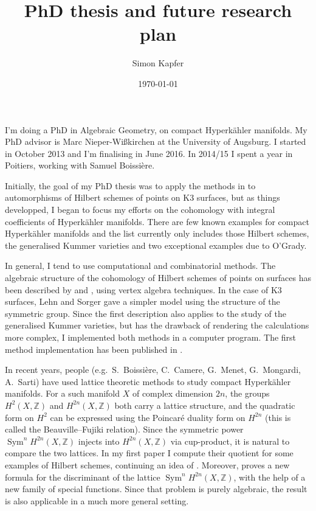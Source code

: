 \documentclass[11pt,a4paper,sans,english]{article}
\title{PhD thesis and future research plan}
\author{Simon Kapfer}
\date{\today}
\DeclareMathOperator{\Sym}{Sym}
\begin{document}
\maketitle
\thispagestyle{plain}

I'm doing a PhD in Algebraic Geometry, on compact Hyperk\"ahler manifolds. My PhD advisor is Marc Nieper-Wi\ss kirchen at the University of Augsburg.
I started in October 2013 and I'm finalising in June 2016. In 2014/15 I spent a year in Poitiers, working with Samuel Boissi\`ere. 

Initially, the goal of my PhD thesis was to apply the methods in \cite{BNS} to automorphisms of Hilbert schemes of points on K3 surfaces, but as things developped, I began to focus my efforts on the cohomology with integral coefficients of Hyperk\"ahler manifolds. There are few known examples for compact Hyperk\"ahler manifolds and the list currently only includes those Hilbert schemes, the generalised Kummer varieties and two exceptional examples due to O'Grady. 

In general, I tend to use computational and combinatorial methods. The algebraic structure of the cohomology of Hilbert schemes of points on surfaces has been described by \cite{LehnSorger} and \cite{LiQinWang}, using vertex algebra techniques. In the case of K3 surfaces, Lehn and Sorger \cite{LehnSorger} gave a simpler model using the structure of the symmetric group. Since the first description also applies to the study of the generalised Kummer varieties, but has the drawback of rendering the calculations more complex, I implemented both methods in a computer program. 
The first method implementation has been published in \cite{SK1}.

In recent years, people (e.g.~S.~Boissi\`ere, C.~Camere, G.~Menet, G.~Mongardi, A.~Sarti) have used lattice theoretic methods to study compact Hyperk\"ahler manifolds. For a such manifold $X$ of complex dimension $2n$, the groups $H^2(X,\mathbb{Z})$ and $H^{2n}(X,\mathbb{Z})$ both carry a lattice structure, and the quadratic form on $H^2$ can be expressed using the Poincar\'e duality form on $H^{2n}$ (this is called the Beauville--Fujiki relation). Since the symmetric power $\Sym^nH^{2n}(X,\mathbb{Z})$ injects into $H^{2n}(X,\mathbb{Z})$ via cup-product, it is natural to compare the two lattices. In my first paper \cite{SK1} I compute their quotient for some examples of Hilbert schemes, continuing an idea of \cite{BNS}. Moreover, \cite{SK2} proves a new formula for the discriminant of the lattice $\Sym^nH^{2n}(X,\mathbb{Z})$, with the help of a new family of special functions. Since that problem is purely algebraic, the result is also applicable in a much more general setting.
\end{document}
